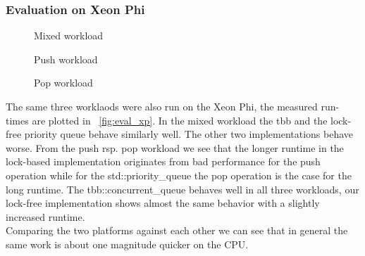 \subsubsection{Evaluation on Xeon Phi}
\begin{figure*}[t]
	\centering
	\begin{subfigure}[b]{0.3\textwidth}
		\centering
		
		\caption{Mixed workload}
		\label{fig:xp_mixed}
	\end{subfigure}
	\hfill
	\begin{subfigure}[b]{0.3\textwidth}
		\centering
		
		\caption{Push workload}
		\label{fig:xp_push}
	\end{subfigure}
	\hfill
	\begin{subfigure}[b]{0.3\textwidth}
		\centering
		
		\caption{Pop workload}
		\label{fig:xp_pop}
	\end{subfigure}
	\caption{Runtime for different workloads executed on a Xeon Phi while varying the number of threads}
	\label{fig:eval_xp}
\end{figure*}
The same three worklaods were also run on the Xeon Phi, the measured run-times are plotted in \figurename~\ref{fig:eval_xp}. In the mixed workload the tbb and the lock-free priority queue behave similarly well. The other two implementations behave worse. From the push rsp. pop workload we see that the longer runtime in the lock-based implementation originates from bad performance for the push operation while for the std::priority\_queue the pop operation is the case for the long runtime. The tbb::concurrent\_queue behaves well in all three workloads, our lock-free implementation shows almost the same behavior with a slightly increased runtime.\\

Comparing the two platforms against each other we can see that in general the same work is about one magnitude quicker on the CPU.

